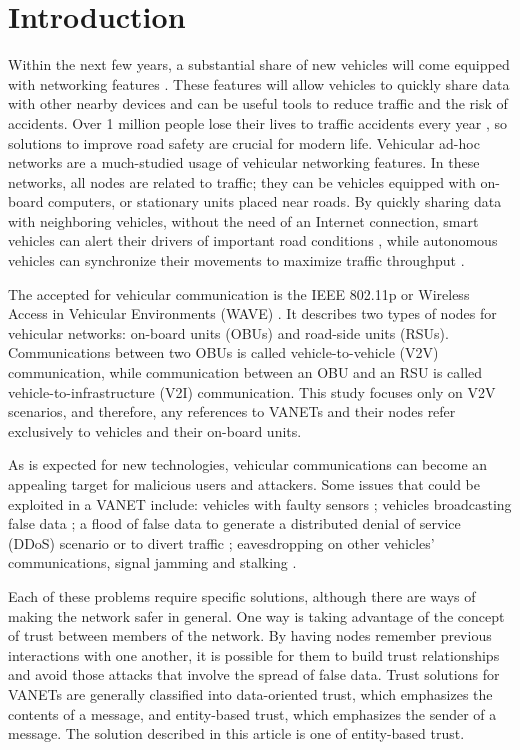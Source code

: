 \documentclass[conference]{IEEEtran}
\begin{document}
\section{Introduction}
\label{section:introduction}

Within the next few years, a substantial share of new vehicles will come equipped with networking features \cite{connectedcar2016}.
These features will allow vehicles to quickly share data with other nearby devices and can be useful tools to reduce traffic and the risk of accidents.
Over 1 million people lose their lives to traffic accidents every year \cite{whotraffic}, so solutions to improve road safety are crucial for modern life.
Vehicular ad-hoc networks are a much-studied usage of vehicular networking features.
In these networks, all nodes are related to traffic; they can be vehicles equipped with on-board computers, or stationary units placed near roads.
By quickly sharing data with neighboring vehicles, without the need of an Internet connection, smart vehicles can alert their drivers of important road conditions \cite{barba2012smart}, while autonomous vehicles can synchronize their movements to maximize traffic throughput \cite{amoozadeh2015platoon}.

The accepted for vehicular communication is the IEEE 802.11p or Wireless Access in Vehicular Environments (WAVE) \cite{jiang2008ieee}.
It describes two types of nodes for vehicular networks: on-board units (OBUs) and road-side units (RSUs).
Communications between two OBUs is called vehicle-to-vehicle (V2V) communication, while communication between an OBU and an RSU is called vehicle-to-infrastructure (V2I) communication.
This study focuses only on V2V scenarios, and therefore, any references to VANETs and their nodes refer exclusively to vehicles and their on-board units.

As is expected for new technologies, vehicular communications can become an appealing target for malicious users and attackers.
Some issues that could be exploited in a VANET include: vehicles with faulty sensors \cite{isaac2010security}; vehicles broadcasting false data \cite{golle2004detecting}; a flood of false data to generate a distributed denial of service (DDoS) scenario or to divert traffic \cite{garip2015congestion}; eavesdropping on other vehicles' communications, signal jamming and stalking \cite{isaac2010security}. 

Each of these problems require specific solutions, although there are ways of making the network safer in general.
One way is taking advantage of the concept of trust between members of the network.
By having nodes remember previous interactions with one another, it is possible for them to build trust relationships and avoid those attacks that involve the spread of false data.
Trust solutions for VANETs are generally classified into data-oriented trust, which emphasizes the contents of a message, and entity-based trust, which emphasizes the sender of a message.
The solution described in this article is one of entity-based trust.
\end{document}
